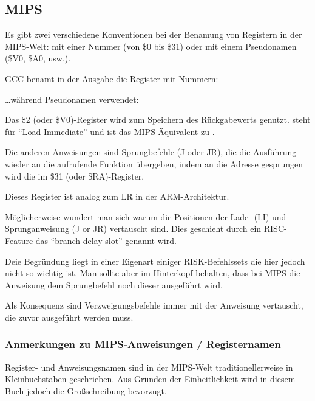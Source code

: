 \subsection{MIPS}

\label{MIPS_leaf_function_ex1}
Es gibt zwei verschiedene Konventionen bei der Benamung von Registern in der MIPS-Welt:
mit einer Nummer (von \$0 bis \$31) oder mit einem Pseudonamen (\$V0, \$A0, usw.).

GCC benamt in der Ausgabe die Register mit Nummern:



\dots während \IDA Pseudonamen verwendet:



Das \$2 (oder \$V0)-Register wird zum Speichern des Rückgabewerts genutzt.
 steht für ``Load Immediate'' und ist das MIPS-Äquivalent zu \MOV.

Die anderen Anweisungen sind Sprungbefehle (J oder JR), die die Ausführung wieder an die aufrufende Funktion übergeben,
indem an die Adresse gesprungen wird die im \$31 (oder \$RA)-Register.

Dieses Register ist analog zum \ac{LR} in der ARM-Architektur.

Möglicherweise wundert man sich warum die Positionen der Lade- (LI) und Sprunganweisung (J or JR) vertauscht sind.
Dies geschieht durch ein \ac{RISC}-Feature das ``branch delay slot'' genannt wird.

Deie Begründung liegt in einer Eigenart einiger RISK-Befehlssets die hier jedoch nicht so wichtig ist. Man sollte
aber im Hinterkopf behalten, dass bei MIPS die Anweisung  dem Sprungbefehl noch  dieser ausgeführt wird.

Als Konsequenz sind Verzweigungsbefehle immer mit der Anweisung vertauscht, die zuvor ausgeführt werden muss.

\subsubsection{Anmerkungen zu MIPS-Anweisungen / Registernamen}

Register- und Anweisungsnamen sind in der MIPS-Welt traditionellerweise in Kleinbuchstaben geschrieben.
Aus Gründen der Einheitlichkeit wird in diesem Buch jedoch die Großschreibung bevorzugt.
